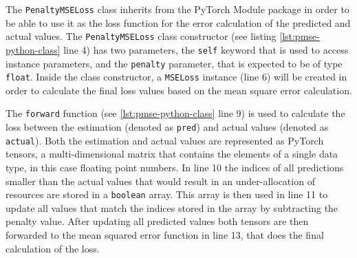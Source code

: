     The \texttt{PenaltyMSELoss} class inherits from the PyTorch Module package in order to be able to use it as the loss function for the error calculation of the predicted and actual values.
    The \texttt{PenaltyMSELoss} class constructor (see listing \ref{lst:pmse-python-class} line 4) has two parameters, the \texttt{self} keyword that is used to access instance parameters, and the \texttt{penalty} parameter, that is expected to be of type \texttt{float}.
    Inside the class constructor, a \texttt{MSELoss} instance (line 6) will be created in order to calculate the final loss values based on the mean square error calculation.

    The \texttt{forward} function (see \ref{lst:pmse-python-class} line 9) is used to calculate the loss between the estimation (denoted as \texttt{pred}) and actual values (denoted as \texttt{actual}). Both the estimation and actual values are represented as PyTorch tensors, a multi-dimensional matrix that contains the elements of a single data type, in this case floating point numbers.
    In line 10 the indices of all predictions smaller than the actual values that would result in an under-allocation of resources are stored in a \texttt{boolean} array.
    This array is then used in line 11 to update all values that match the indices stored in the array by subtracting the penalty value.
    After updating all predicted values both tensors are then forwarded to the mean squared error function in line 13, that does the final calculation of the loss.

    


